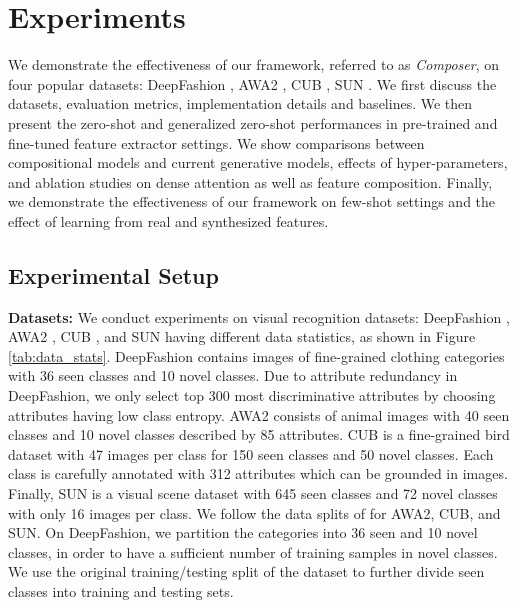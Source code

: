 \documentclass[10pt,journal,compsoc]{IEEEtran}
\newcommand{\1}{\boldsymbol{1}}
\newcommand{\0}{\boldsymbol{0}}
\newcommand{\<}{\langle}
\renewcommand{\>}{\rangle}
\newcommand{\myparagraph}[1]{\vspace{-2pt}\medskip\noindent\textbf{#1}}
\begin{document}
\section{Experiments}
\label{sec:experiments}
We demonstrate the effectiveness of our framework, referred to as \emph{Composer}, on four popular datasets: DeepFashion \cite{Liu:CVPR16}, AWA2 \cite{Xian:PAMI18}, CUB \cite{Welinder:report10}, SUN \cite{Patterson:CVPR12}. 
We first discuss the datasets, evaluation metrics, implementation details and baselines. 
We then present the zero-shot and generalized zero-shot performances in pre-trained and fine-tuned feature extractor settings. We show comparisons between compositional models and current generative models, effects of hyper-parameters, and ablation studies on dense attention as well as feature composition.
Finally, we demonstrate the effectiveness of our framework on few-shot settings and the effect of learning from real and synthesized features.  
\subsection{Experimental Setup}
\myparagraph{Datasets:}
We conduct experiments on visual recognition datasets: DeepFashion \cite{Liu:CVPR16}, AWA2 \cite{Xian:PAMI18}, CUB \cite{Welinder:report10}, and SUN \cite{Patterson:CVPR12} having different data statistics, as shown in Figure \ref{tab:data_stats}.
DeepFashion \cite{Liu:CVPR16} contains images of fine-grained clothing categories with 36 seen classes and 10 novel classes.
Due to attribute redundancy in DeepFashion, we only select top 300 most discriminative attributes by choosing attributes having low class entropy.
AWA2 \cite{Xian:PAMI18} consists of animal images with 40 seen classes and 10 novel classes described by 85 attributes.
CUB \cite{Welinder:report10} is a fine-grained bird dataset with 47 images per class for 150 seen classes and 50 novel classes. Each class is carefully annotated with 312 attributes which can be grounded in images.
Finally, SUN \cite{Patterson:CVPR12} is a visual scene dataset with 645 seen classes and 72 novel classes with only 16 images per class. 
We follow the data splits of \cite{Xian:PAMI18} for AWA2, CUB, and SUN.
On DeepFashion, we partition the categories into 36 seen and 10 novel classes, in order to have a sufficient number of training samples in novel classes.
We use the original training/testing split of the dataset to further divide seen classes into training and testing sets.
\end{document}
